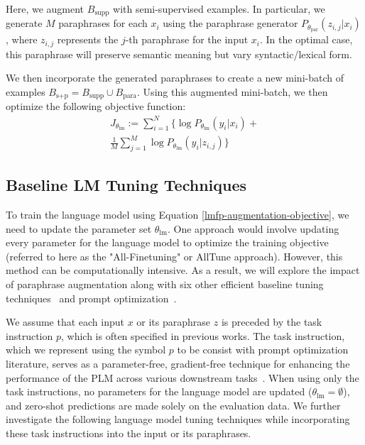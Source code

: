 \documentclass[11pt]{article}
\begin{document}
Here, we augment $B_{\text{supp}}$ with semi-supervised examples. In particular, we generate $M$ paraphrases for each $x_i$ using the paraphrase generator $P_{\theta_{\text{par}}} (z_{i,j} | x_i)$, where $z_{i,j}$ represents the $j$-th paraphrase for the input $x_i$.  In the optimal case, this paraphrase will preserve semantic meaning but vary syntactic/lexical form.

We then incorporate the generated paraphrases to create a new mini-batch of examples $B_{\text{s+p}} = B_{\text{supp}} \cup B_{\text{para}}$.  Using this augmented mini-batch, we then optimize the following objective function:
\begin{multline}
J_{\theta_{\text{lm}}} := \sum_{i=1}^N \{\log P_{\theta_{\text{lm}}} (y_i | x_i) + \\
\frac{1}{M} \sum_{j=1}^{M} \log P_{\theta_{\text{lm}}} (y_i | z_{i,j})\}
\label{lmfp-augmentation-objective}
\end{multline}

\subsection{Baseline LM Tuning Techniques}
To train the language model using Equation \ref{lmfp-augmentation-objective}, we need to update the parameter set $\theta_{\text{lm}}$. One approach would involve updating every parameter for the language model to optimize the training objective (referred to here as the "All-Finetuning" or AllTune approach).  However, this method can be computationally intensive. As a result, we will explore the impact of paraphrase augmentation along with six other efficient baseline tuning techniques~\cite{pmlr-v97-houlsby19a} and prompt optimization~\cite{liu2021pretrain}.

We assume that each input $x$ or its paraphrase $z$ is preceded by the task instruction $p$, which is often specified in previous works. The task instruction, which we represent using the symbol $p$ to be consist with prompt optimization literature, serves as a parameter-free, gradient-free technique for enhancing the performance of the PLM across various downstream tasks~\cite{DBLP:journals/corr/abs-2005-14165, petroni-etal-2019-language, deng-etal-2022-rlprompt}. When using only the task instructions, no parameters for the language model are updated ($\theta_{\text{lm}}=\emptyset$), and zero-shot predictions are made solely on the evaluation data. We further investigate the following language model tuning techniques while incorporating these task instructions into the input or its paraphrases.
\end{document}
